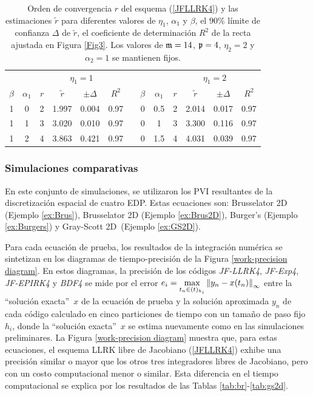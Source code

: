 \begin{table}[htb]
	\centering
	\caption{
        Orden de convergencia $r$ del esquema (\ref{JFLLRK4}) y las estimaciones $\widetilde{r}$ para diferentes valores de  $\eta_1$, $\alpha_1$ y $\beta$, el $90\%$ límite de confianza $\Delta$ de $\widetilde{r}$, el coeficiente de determinación $R^2$ de la recta ajustada en Figura \ref{Fig3}. Los valores de $\mathfrak{m}=14$, $\mathfrak{p}=4$, $\eta_2=2$ y$\alpha_2=1$ se mantienen fijos.}
	\begin{adjustbox}{width=0.8\columnwidth,center}
		\begin{tabular}{ccccccccccccc}
			\hline
			&  & \multicolumn{4}{c}{$\eta _{1}=1$} &  &  &  & \multicolumn{4}{c}{$\eta
				_{1}=2$} \\ \cline{3-6}\cline{10-13}
			$\beta $ & $\alpha _{1}$ & $r$ & $\widetilde{r}$ & $\pm \varDelta$ & $R^{2}$
			&  & $\beta $ & $\alpha _{1}$ & $r$ & $\widetilde{r}$ & $\pm \varDelta$ & $%
			R^{2}$ \\ \hline
			1 & 0 & 2 & 1.997 & 0.004 & 0.97 &  & 0 & 0.5 & 2 & 2.014 & 0.017 & 0.97 \\ 
			1 & 1 & 3 & 3.020 & 0.010 & 0.97 &  & 0 & 1 & 3 & 3.300 & 0.116 & 0.97 \\ 
			1 & 2 & 4 & 3.863 & 0.421 & 0.97 &  & 0 & 1.5 & 4 & 4.031 & 0.039 & 0.97 \\ 
			\hline
		\end{tabular}
	\end{adjustbox}
	\label{tab:in}
\end{table}

\subsubsection{Simulaciones comparativas}\label{sc:comparison}

En este conjunto de simulaciones, se utilizaron los PVI resultantes de la discretización espacial de cuatro EDP. Estas ecuaciones son: Brusselator 2D (Ejemplo \ref{ex:Brus}), Brusselator 2D (Ejemplo \ref{ex:Brus2D}), Burger's (Ejemplo \ref{ex:Burgers}) y Gray-Scott 2D~(Ejemplo \ref{ex:GS2D}).

Para cada ecuación de prueba, los resultados de la integración numérica se sintetizan en los diagramas de tiempo-precisión de la Figura \ref{work-precision diagram}. En estos diagramas, la precisión de los códigos \textit{JF-LLRK4}, \textit{JF-Exp4}, \textit{JF-EPIRK4} y \textit{BDF4} se mide por el error $e_i=\max\limits_ {t_n\in(t)_{h_i}}\left\lVert y_n-x(t_n) \right\rVert_\infty$ entre la \textquotedblleft solución exacta\textquotedblright~$x$ de la ecuación de prueba y la solución aproximada $y_n$ de cada código calculado en cinco particiones de tiempo con un tamaño de paso fijo $h_i$, donde la \textquotedblleft solución exacta\textquotedblright ~$x $ se estima nuevamente como en las simulaciones preliminares. La Figura \ref{work-precision diagram} muestra que, para estas ecuaciones, el esquema LLRK libre de Jacobiano (\ref{JFLLRK4}) exhibe una precisión similar o mayor que los otros tres integradores libres de Jacobiano, pero con un costo computacional menor o similar. Esta diferencia en el tiempo computacional se explica por los resultados de las Tablas \ref{tab:br}-\ref{tab:gs2d}.

